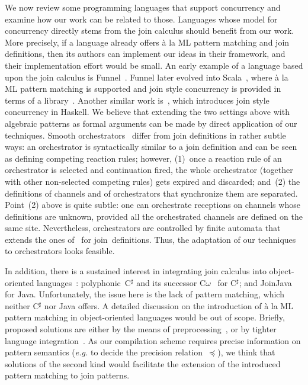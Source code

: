 \documentclass{LMCS}
\makeatletter
\newcommand{\eg}{\emph{e.g.}\@\xspace}
\newcommand{\csharp}{C$^{\sharp}$\xspace}
\newcommand{\haskell}{\textrm{Haskell}\xspace}
\newcommand{\comega}{C$\omega$\xspace}
\newcommand{\funnel}{\textrm{Funnel}\xspace}
\newcommand{\scala}{\textrm{Scala}\xspace}
\newcommand{\java}{\textrm{Java}\xspace}
\newcommand{\joinjava}{\textrm{JoinJava}\xspace}
\renewcommand{\_}{\mathord{\rule[-.25ex]{1ex}{.15ex}}}
\makeatother
\begin{document}
We now review some programming languages that support concurrency and
examine how our work can be related to those. Languages whose model
for concurrency directly stems from the join calculus should benefit
from our work. More precisely, if a language already offers \`{a} la
ML pattern matching and join definitions, then its authors can
implement our ideas in their framework, and their implementation
effort would be small. An early example of a language based upon the
join calculus is \funnel~\cite{funnel}. \funnel later evolved into
\scala~\cite{Odersky:scala}, where \`{a} la ML pattern matching is
supported and join style concurrency is provided in terms of a
library~\cite{JoinScala}. Another similar work is~\cite{Singh06},
which introduces join style concurrency in \haskell. We believe that
extending the two settings above
with algebraic patterns as formal arguments
can be made by direct application of our techniques.
Smooth orchestrators~\cite{Orchestrators} differ from join definitions
in rather subtle ways: an orchestrator is syntactically similar to a
join definition and can be seen as defining competing reaction rules;
however, (1)~once a reaction rule of an orchestrator is selected and
continuation fired, the whole orchestrator (together with other
non-selected competing rules) gets expired and discarded; and~(2) the
definitions of channels and of orchestrators that synchronize them are
separated.
Point~(2) above is quite subtle: one can orchestrate receptions
on channels whose definitions are unknown, provided
all the orchestrated channels are defined on the same site.
Nevertheless,
orchestrators are controlled by finite automata that extends the ones
of~\cite{LeFessantMarangetCompileJoin} for join~definitions.  Thus,
the adaptation of our techniques to orchestrators looks feasible.

In addition, there is a sustained interest in integrating join
calculus into object-oriented languages~: polyphonic~\csharp and its
successor \comega~\cite{Cw} for \csharp; and \joinjava~\cite{JoinJava}
for \java. Unfortunately, the issue here is the lack of pattern
matching, which neither \csharp nor \java offers.  A detailed
discussion on the introduction of \`{a} la ML pattern matching in
object-oriented languages would be out of scope.  Briefly, proposed
solutions are either by the means of preprocessing~\cite{TOM}, or by
tighter language integration~\cite{Odersky:scala,OOMatch}. As our
compilation scheme requires precise information on pattern semantics
(\eg to decide the precision relation~$\preceq$), we think
that solutions of the second kind would facilitate the extension of
the introduced pattern matching to join patterns.
\end{document}
